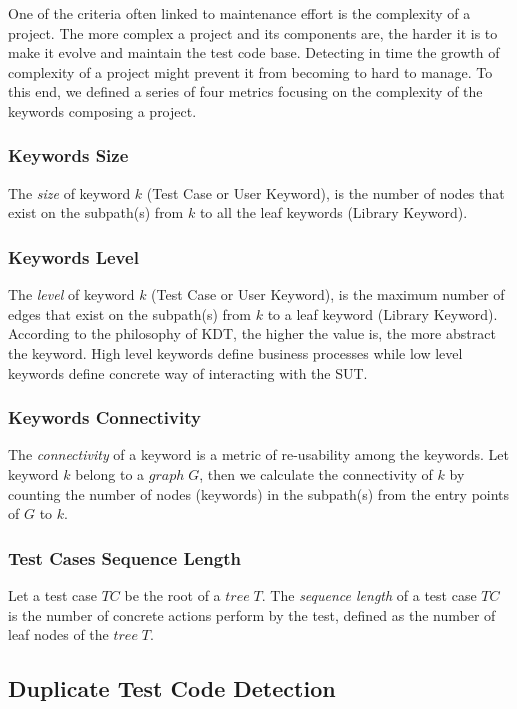 One of the criteria often linked to maintenance effort is the complexity of a project. The more complex a project and its components are, the harder it is to make it evolve and maintain the test code base. Detecting in time the growth of complexity of a project might prevent it from becoming to hard to manage. To this end, we defined a series of four metrics focusing on the complexity of the keywords composing a project.

\subsubsection{Keywords Size} The \emph{size} of keyword $k$ (Test Case or User Keyword), is the number of nodes that exist on the subpath(s) from $k$ to all the leaf keywords (Library Keyword).

\subsubsection{Keywords Level} The \emph{level} of keyword $k$ (Test Case or User Keyword), is the maximum number of edges that exist on the subpath(s) from $k$ to a leaf keyword (Library Keyword). According to the philosophy of KDT, the higher the value is, the more abstract the keyword. High level keywords define business processes while low level keywords define concrete way of interacting with the SUT.

\subsubsection{Keywords Connectivity} The \emph{connectivity} of a keyword is a metric of re-usability among the keywords. Let keyword $k$ belong to a $graph\; G$, then we calculate the connectivity of $k$ by counting the number of nodes (keywords) in the subpath(s) from the entry points of $G$ to $k$.

\subsubsection{Test Cases Sequence Length} Let a test case $TC$ be the root of a $tree\; T$. The \emph{sequence length} of a test case $TC$ is the number of concrete actions perform by the test, defined as the number of leaf nodes of the $tree\; T$.

\subsection{Duplicate Test Code Detection}

